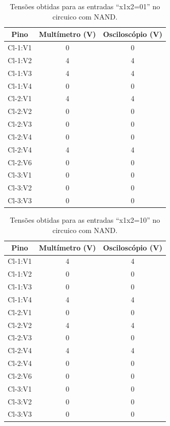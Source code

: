    \begin{table}[H]
	   \centering
	   \caption{Tensões obtidas para as entradas “x1x2=01” no circuico com NAND.}
	   \label{table:tabelaVerdade21}
	   \begin{tabular}{c|c|c}
		   \textbf{Pino} & \textbf{Multímetro (V)} & \textbf{Osciloscópio (V)}\\
		   \hline
		   Cl-1:V1 & 0 & 0 \\
		   Cl-1:V2 & 4 & 4 \\
		   Cl-1:V3 & 4 & 4 \\
		   Cl-1:V4 & 0 & 0 \\
		   \hline
		   Cl-2:V1 & 4 & 4 \\
		   Cl-2:V2 & 0 & 0 \\
		   Cl-2:V3 & 0 & 0 \\
		   Cl-2:V4 & 0 & 0 \\
		   Cl-2:V4 & 4 & 4 \\
		   Cl-2:V6 & 0 & 0 \\
		   \hline
		   Cl-3:V1 & 0 & 0 \\
		   Cl-3:V2 & 0 & 0 \\
		   Cl-3:V3 & 0 & 0 \\
	   \end{tabular}
   \end{table}

   \begin{table}[H]
	   \centering
	   \caption{Tensões obtidas para as entradas “x1x2=10” no circuico com NAND.}
	   \label{table:tabelaVerdade22}
	   \begin{tabular}{c|c|c}
		   \textbf{Pino} & \textbf{Multímetro (V)} & \textbf{Osciloscópio (V)}\\
		   \hline
		   Cl-1:V1 & 4 & 4 \\
		   Cl-1:V2 & 0 & 0 \\
		   Cl-1:V3 & 0 & 0 \\
		   Cl-1:V4 & 4 & 4 \\
		   \hline
		   Cl-2:V1 & 0 & 0 \\
		   Cl-2:V2 & 4 & 4 \\
		   Cl-2:V3 & 0 & 0 \\
		   Cl-2:V4 & 4 & 4 \\
		   Cl-2:V4 & 0 & 0 \\
		   Cl-2:V6 & 0 & 0 \\
		   \hline
		   Cl-3:V1 & 0 & 0 \\
		   Cl-3:V2 & 0 & 0 \\
		   Cl-3:V3 & 0 & 0 \\
	   \end{tabular}
   \end{table}

